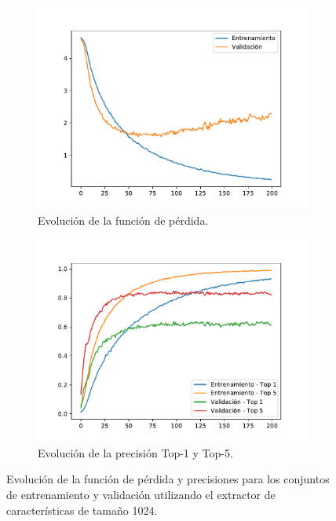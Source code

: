 \documentclass[../main.tex]{memoir}
\begin{document}
\begin{figure}[hbtp]
  \centering
  \begin{subfigure}{0.49\textwidth}
    \centering
    \includegraphics[width=\linewidth]{images/extractor_loss.pdf}
    \caption{Evolución de la función de pérdida.}
  \end{subfigure}
  \begin{subfigure}{0.49\textwidth}
    \centering
    \includegraphics[width=\linewidth]{images/extractor_acc.pdf}
    \caption{Evolución de la precisión Top-1 y Top-5.}
  \end{subfigure}
  \caption{Evolución de la función de pérdida y precisiones para los
    conjuntos de entrenamiento y validación utilizando el extractor
    de características de tamaño 1024.}
  \label{fig:loss-top-k-extractor}
\end{figure}
\end{document}
